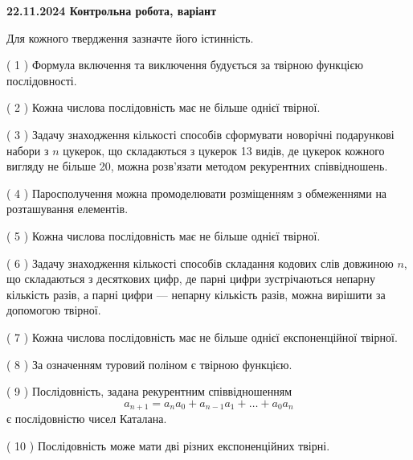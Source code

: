 \documentclass[12pt, ukrainian]{article}
\begin{document}
\vspace{4mm}
\newpage
\begin {large}

\textbf{22.11.2024 Контрольна робота, варіант  }\par


{
Для кожного твердження зазначте його істинність.\par
\vspace{2mm}
( 1 ) Формула включення та виключення будується за твірною функцією послідовності.%

( 2 ) Кожна числова послідовність має не більше однієї твірної.%

( 3 ) Задачу знаходження кількості способів сформувати новорічні подарункові набори з $n$ цукерок, що складаються з цукерок 13 видів, де цукерок кожного вигляду не більше 20, можна розв’язати методом рекурентних співвідношень.%

( 4 ) Паросполучення можна промоделювати розміщенням з обмеженнями на розташування елементів.%

( 5 ) Кожна числова послідовність має не більше однієї твірної.%

( 6 ) Задачу знаходження кількості способів складання кодових слів довжиною $n$, що складаються з десяткових цифр, де парні цифри зустрічаються непарну кількість разів, а парні цифри — непарну кількість разів, можна вирішити за допомогою твірної.%

( 7 ) Кожна числова послідовність має не більше однієї  експоненційної твірної.%

( 8 ) За означенням туровий поліном є твірною функцією.%

( 9 ) Послідовність, задана рекурентним співвідношенням $$a_{n+1}=a_{n}a_{0}+a_{n-1}a_{1}+\ldots+a_0a_{n}$$ є послідовністю чисел Каталана.%

( 10 ) Послідовність може мати дві різних експоненційних твірні.%


\vspace{5mm}
}
\end {large}
\end{document}
